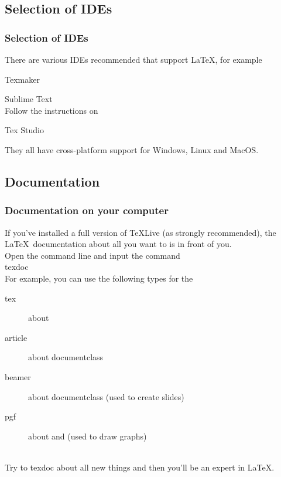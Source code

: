 \subsection{Selection of IDEs}

\begin{frame}
	\frametitle{Selection of IDEs}
	There are various IDEs recommended that support \LaTeX , for example\\
	\begin{block}{Texmaker}
	\end{block}
	\begin{block}{Sublime Text}
		 \\[0.5em]
		Follow the instructions on 
	\end{block}
	\begin{block}{Tex Studio}
	\end{block}
	They all have cross-platform support for Windows, Linux and MacOS.
\end{frame}

\subsection{Documentation}

\begin{frame}
	\frametitle{Documentation on your computer}
	If you've installed a full version of TeXLive (as strongly recommended), the \LaTeX\ documentation about all you want to is in front of you.\\[0.5em]
	Open the command line and input the command\\
	\alert{texdoc} \\[0.5em]
	For example, you can use the following types for the 
	\begin{description}
		\item[tex] 		about \\
		\item[article] 	about documentclass \\
		\item[beamer] 	about documentclass  (used to create slides)\\
		\item[pgf]		about  and  (used to draw graphs)\\
	\end{description}
	\ \\[-0.5em]
	Try to \alert{texdoc} about all new things and then you'll be an expert in \LaTeX.
\end{frame}

